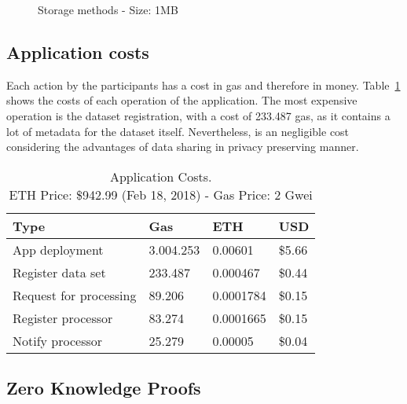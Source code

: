 \begin{figure}[!ht]
  \centering
  \caption{Storage methods - Size: 1MB}
  \label{fig:storage:charts:1mb}
\end{figure}

\subsection{Application costs}
\label{evaluation:app_costs}

Each action by the participants has a cost in gas and therefore in money. Table~\ref{table:app_costs} shows the costs of each operation of the application. The most expensive operation is the dataset registration, with a cost of 233.487 gas, as it contains a lot of metadata for the dataset itself. Nevertheless, is an negligible cost considering the advantages of data sharing in privacy preserving manner.

\begin{table}[!htb]
\centering
\captionsetup{format=hang, justification=centering}
\caption{Application Costs.\\ ETH Price: \$942.99 (Feb 18, 2018) - Gas Price: 2 Gwei}
\begin{tabular}{|l|l|l|l|}
\hline
 Type & Gas & ETH & USD \\ \hline
 App deployment & 3.004.253 & 0.00601 & \$5.66 \\ \hline
 Register data set & 233.487 & 0.000467 & \$0.44 \\ \hline
 Request for processing & 89.206 & 0.0001784 & \$0.15 \\ \hline
 Register processor & 83.274 & 0.0001665 & \$0.15 \\ \hline
 Notify processor & 25.279 & 0.00005 & \$0.04 \\ \hline
\end{tabular}
\label{table:app_costs}
\end{table}

\subsection{Zero Knowledge Proofs}
\label{evaluation:zkp}

